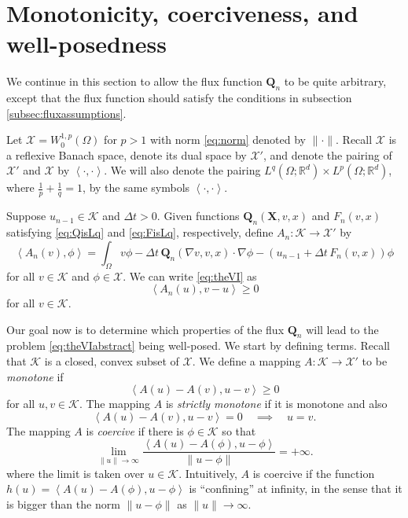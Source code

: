 \documentclass[final,leqno,onefignum,onetabnum]{siamltex1213bueler}
\newcommand\bQ{\mathbf{Q}}
\newcommand\bX{\mathbf{X}}
\renewcommand{\grad}{\nabla}
\newcommand{\ip}[2]{\ensuremath{\left<#1,#2\right>}}
\newcommand\RR{\mathbb{R}}
\begin{document}
\section{Monotonicity, coerciveness, and well-posedness} \label{sec:mono}

We continue in this section to allow the flux function $\bQ_n$ to be quite arbitrary, except that the flux function should satisfy the conditions in subsection \ref{subsec:fluxassumptions}.

Let $\mathcal{X} = W_0^{1,p}(\Omega)$ for $p > 1$ with norm \eqref{eq:norm} denoted by $\|\cdot\|$.  Recall $\mathcal{X}$ is a reflexive Banach space, denote its dual space by $\mathcal{X}'$, and denote the pairing of $\mathcal{X}'$ and $\mathcal{X}$ by $\ip{\cdot}{\cdot}$.  We will also denote the pairing $L^q(\Omega;\RR^d) \times L^p(\Omega;\RR^d)$, where $\frac{1}{p}+\frac{1}{q}=1$, by the same symbols $\ip{\cdot}{\cdot}$.

\medskip
\newcommand{\An}{A_{n}}
\begin{definition}  Suppose $u_{n-1}\in\mathcal{K}$ and $\Delta t>0$.  Given functions $\bQ_n(\bX,v,x)$ and $F_n(v,x)$ satisfying \eqref{eq:QisLq} and \eqref{eq:FisLq}, respectively, define $\An:\mathcal{K} \to \mathcal{X}'$ by
\begin{equation}
  \ip{\An(v)}{\phi} = \int_\Omega v \phi - \Delta t\, \bQ_n(\grad v,v,x) \cdot \grad\phi - \left(u_{n-1} + \Delta t\, F_n(v,x) \right) \phi \label{eq:defineAn}
\end{equation}
for all $v \in \mathcal{K}$ and $\phi\in\mathcal{X}$.  We can write \eqref{eq:theVI} as
\begin{equation}
  \ip{\An(u)}{v-u} \ge 0 \label{eq:theVIabstract}
\end{equation}
for all $v \in \mathcal{K}$.
\end{definition}

\medskip
Our goal now is to determine which properties of the flux $\bQ_n$ will lead to the problem \eqref{eq:theVIabstract} being well-posed.  We start by defining terms.  Recall that $\mathcal{K}$ is a closed, convex subset of $\mathcal{X}$.  We define a mapping $A : \mathcal{K} \to \mathcal{X}'$ to be \emph{monotone} if
    $$\ip{A(u) - A(v)}{u-v} \ge 0$$
for all $u,v\in\mathcal{K}$.  The mapping $A$ is \emph{strictly monotone} if it is monotone and also
    $$\ip{A(u) - A(v)}{u-v} = 0 \quad \implies \quad u=v.$$
The mapping $A$ is \emph{coercive} if there is $\phi\in \mathcal{K}$ so that
    $$\lim_{\|u\|\to\infty} \frac{\ip{A(u) - A(\phi)}{u-\phi}}{\|u-\phi\|} = +\infty.$$
where the limit is taken over $u\in\mathcal{K}$.  Intuitively, $A$ is coercive if the function $h(u)=\ip{A(u) - A(\phi)}{u-\phi}$ is ``confining'' at infinity, in the sense that it is bigger than the norm $\|u-\phi\|$ as $\|u\|\to\infty$.
\end{document}
